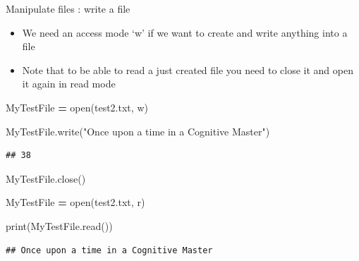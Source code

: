 \documentclass[
  8pt,
  ignorenonframetext,
]{beamer}
\newenvironment{Shaded}{\begin{snugshade}}{\end{snugshade}}
\newcommand{\BuiltInTok}[1]{#1}
\newcommand{\NormalTok}[1]{#1}
\newcommand{\OperatorTok}[1]{\textcolor[rgb]{0.81,0.36,0.00}{\textbf{#1}}}
\newcommand{\StringTok}[1]{\textcolor[rgb]{0.31,0.60,0.02}{#1}}
\begin{document}
\begin{frame}[fragile]{Manipulate files : write a file}
\protect\hypertarget{manipulate-files-write-a-file}{}
\begin{itemize}
\item
  We need an access mode `w' if we want to create and write anything
  into a file
\item
  Note that to be able to read a just created file you need to close it
  and open it again in read mode
\end{itemize}

\begin{Shaded}
\begin{Highlighting}[]
\NormalTok{MyTestFile }\OperatorTok{=} \BuiltInTok{open}\NormalTok{(}\StringTok{\textquotesingle{}test2.txt\textquotesingle{}}\NormalTok{, }\StringTok{\textquotesingle{}w\textquotesingle{}}\NormalTok{)}

\NormalTok{MyTestFile.write(}\StringTok{"Once upon a time in a Cognitive Master"}\NormalTok{)}
\end{Highlighting}
\end{Shaded}

\begin{verbatim}
## 38
\end{verbatim}

\begin{Shaded}
\begin{Highlighting}[]
\NormalTok{MyTestFile.close()}

\NormalTok{MyTestFile }\OperatorTok{=} \BuiltInTok{open}\NormalTok{(}\StringTok{\textquotesingle{}test2.txt\textquotesingle{}}\NormalTok{, }\StringTok{\textquotesingle{}r\textquotesingle{}}\NormalTok{)}

\BuiltInTok{print}\NormalTok{(MyTestFile.read())}
\end{Highlighting}
\end{Shaded}

\begin{verbatim}
## Once upon a time in a Cognitive Master
\end{verbatim}
\end{frame}
\end{document}
